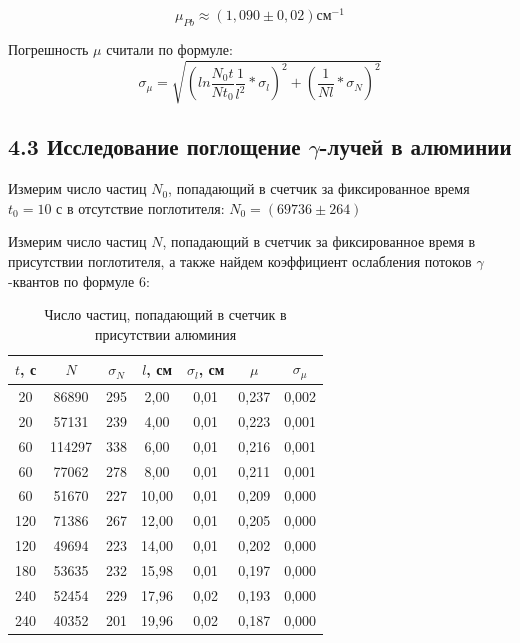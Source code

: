 \documentclass[a4paper,12pt]{report}
\begin{document}
\begin{equation*}
    \mu_{Pb} \approx (1,090\pm0,02)\text{см}^{-1}
\end{equation*}

Погрешность $\mu$ считали по формуле:
\begin{equation*}
    \sigma_{\mu} = \sqrt{(ln\frac{N_{0}t}{Nt_{0}}\frac{1}{l^{2}}*\sigma_{l})^{2} + (\frac{1}{Nl}*\sigma_{N})^2}
\end{equation*}


\subsection*{4.3 Исследование поглощение $\gamma$-лучей в алюминии}

Измерим число частиц $N_{0}$, попадающий в счетчик за фиксированное время $t_{0} = 10$ с в отсутствие поглотителя: $N_{0} = (69736\pm264)$

Измерим число частиц $N$, попадающий в счетчик за фиксированное время в присутствии поглотителя, а также найдем коэффициент ослабления потоков $\gamma$-квантов по формуле 6:

\begin{table}[H]
\begin{tabular}{|c|c|c|c|c|c|c|}
\hline
$t$, с & $N$      & $\sigma_{N}$ & $l$, см & $\sigma_{l}$, см & $\mu$    & $\sigma_{\mu}$ \\ \hline
20   & 86890  & 295          & 2,00  & 0,01             & 0,237 & 0,002    \\ \hline
20   & 57131  & 239          & 4,00  & 0,01             & 0,223 & 0,001    \\ \hline
60   & 114297 & 338          & 6,00  & 0,01             & 0,216 & 0,001    \\ \hline
60   & 77062  & 278          & 8,00  & 0,01             & 0,211 & 0,001    \\ \hline
60   & 51670  & 227          & 10,00 & 0,01             & 0,209 & 0,000    \\ \hline
120  & 71386  & 267          & 12,00 & 0,01             & 0,205 & 0,000    \\ \hline
120  & 49694  & 223          & 14,00 & 0,01             & 0,202 & 0,000    \\ \hline
180  & 53635  & 232          & 15,98 & 0,01             & 0,197 & 0,000    \\ \hline
240  & 52454  & 229          & 17,96 & 0,02             & 0,193 & 0,000    \\ \hline
240  & 40352  & 201          & 19,96 & 0,02             & 0,187 & 0,000    \\ \hline
\end{tabular}
\caption{Число частиц, попадающий в счетчик в присутствии алюминия}
\end{table}
\end{document}
